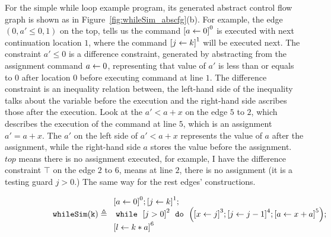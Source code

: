 \begin{example}
  \label{ex:whileSim_abscfg}
    For the simple while loop example program, 
its generated abstract control flow graph is shown as in Figure~\ref{fig:whileSim_abscfg}(b).
For example, the edge $(0, a' \leq 0, 1)$ on the top, tells us the command 
$\clabel{\assign{a}{0}}^0$ is executed with next continuation location $1$,
where the 
command $\clabel{\assign{j}{k}}^1$ will be executed next.
The constraint $a' \leq 0$ is a difference constraint, generated by abstracting from the assignment command $\assign{a}{0}$,
representing that value of $a'$ is less than or equals to $0$ after 
location $0$ before executing command at line $1$. The difference constraint is an inequality relation between, 
the left-hand side of the inequality talks about the variable before the execution and the right-hand side ascribes those after the execution. 
Look at the $a' < a+x $ on the edge $5$ to $2$, which describes the execution of the command at line $5$, 
which is an assignment $a' = a+x$. The $a'$ on the left side of $a' < a+x$ represents the value of $a$ after the assignment, while the right-hand side $a$ stores the value before the assignment. 
$top$ means there is no assignment executed, for example, I have the difference constraint $\top$ on the edge $2$ to $6$, 
means at line $2$, there is no assignment (it is a testing guard $j>0$.) 
%
The same way for the rest edges' constructions.
\begin{figure} 
  \centering
  \begin{subfigure}{.7\textwidth}
  \begin{centering}
  {\small
  $
  \kw{whileSim(k)} \triangleq
    \begin{array}{l}
        \clabel{ \assign{a}{0}}^{0} ;   
              \clabel{\assign{j}{k} }^{1} ;\\
              \ewhile ~ \clabel{j > 0}^{2} ~ \edo ~ 
              \Big(
               \clabel{\assign{x}{j} }^{3}  ;
               \clabel{\assign{j}{j-1}}^{4} ;
              \clabel{\assign{a}{x + a}}^{5}  \Big);\\
              \clabel{\assign{l}{k * a} }^{6}
          \end{array}
  $
  }
  \caption{}
  \end{centering}
  \end{subfigure}
    \begin{subfigure}{.45\textwidth}
    \begin{centering}
  \begin{tikzpicture}[scale=\textwidth/20cm,samples=200]

\end{tikzpicture}
\end{centering}
\end{subfigure}
\end{figure}
\end{example}
